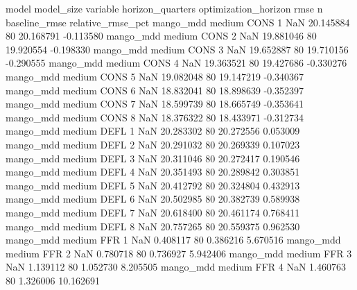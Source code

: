             model model_size variable  horizon_quarters optimization_horizon      rmse  n  baseline_rmse  relative_rmse_pct
        mango_mdd     medium     CONS                 1                  NaN 20.145884 80      20.168791          -0.113580
        mango_mdd     medium     CONS                 2                  NaN 19.881046 80      19.920554          -0.198330
        mango_mdd     medium     CONS                 3                  NaN 19.652887 80      19.710156          -0.290555
        mango_mdd     medium     CONS                 4                  NaN 19.363521 80      19.427686          -0.330276
        mango_mdd     medium     CONS                 5                  NaN 19.082048 80      19.147219          -0.340367
        mango_mdd     medium     CONS                 6                  NaN 18.832041 80      18.898639          -0.352397
        mango_mdd     medium     CONS                 7                  NaN 18.599739 80      18.665749          -0.353641
        mango_mdd     medium     CONS                 8                  NaN 18.376322 80      18.433971          -0.312734
        mango_mdd     medium     DEFL                 1                  NaN 20.283302 80      20.272556           0.053009
        mango_mdd     medium     DEFL                 2                  NaN 20.291032 80      20.269339           0.107023
        mango_mdd     medium     DEFL                 3                  NaN 20.311046 80      20.272417           0.190546
        mango_mdd     medium     DEFL                 4                  NaN 20.351493 80      20.289842           0.303851
        mango_mdd     medium     DEFL                 5                  NaN 20.412792 80      20.324804           0.432913
        mango_mdd     medium     DEFL                 6                  NaN 20.502985 80      20.382739           0.589938
        mango_mdd     medium     DEFL                 7                  NaN 20.618400 80      20.461174           0.768411
        mango_mdd     medium     DEFL                 8                  NaN 20.757265 80      20.559375           0.962530
        mango_mdd     medium      FFR                 1                  NaN  0.408117 80       0.386216           5.670516
        mango_mdd     medium      FFR                 2                  NaN  0.780718 80       0.736927           5.942406
        mango_mdd     medium      FFR                 3                  NaN  1.139112 80       1.052730           8.205505
        mango_mdd     medium      FFR                 4                  NaN  1.460763 80       1.326006          10.162691

